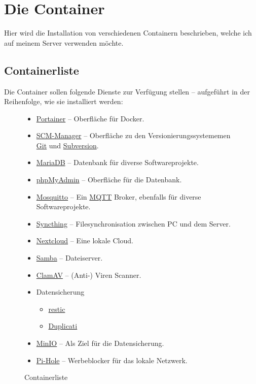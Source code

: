 \documentclass[12pt,a4paper,ngerman]{article}
\newcommand{\jpacaption}[1]{\caption{#1}\label{fig:#1}}
\begin{document}
\section{Die Container}
Hier wird die Installation von verschiedenen Containern beschrieben, welche ich
auf meinem Server verwenden möchte.

\subsection{Containerliste}
Die Container sollen folgende Dienste zur Verfügung stellen -- aufgeführt in der Reihenfolge, wie sie installiert werden:

\begin{figure}[H]
    \begin{itemize}
        \item \href{https://www.portainer.io/}{Portainer} -- Oberfläche für Docker.
        \item \href{https://www.scm-manager.org/}{SCM-Manager} -- Oberfläche zu den Versionierungssystememen \href{https://git-scm.com/}{Git}
              und \href{https://subversion.apache.org/}{Subversion}.
        \item \href{https://mariadb.org/}{MariaDB} -- Datenbank für diverse Softwareprojekte.
        \item \href{https://www.phpmyadmin.net/}{phpMyAdmin} -- Oberfläche für die Datenbank.
        \item \href{https://mosquitto.org/}{Mosquitto} -- Ein \href{https://mqtt.org/}{MQTT} Broker, ebenfalls für diverse
              Softwareprojekte.
        \item \href{https://syncthing.net/}{Syncthing} -- Filesynchronisation zwischen PC und dem Server.
        \item \href{https://nextcloud.com/}{Nextcloud} -- Eine lokale Cloud.
        \item \href{https://www.samba.org/}{Samba} -- Dateiserver.
        \item \href{https://www.clamav.net/}{ClamAV} -- (Anti-) Viren Scanner.
        \item Datensicherung
              \begin{itemize}
                  \item \href{https://restic.net/}{restic}
                  \item \href{https://www.duplicati.com/}{Duplicati}
              \end{itemize}
        \item \href{https://docs.min.io/}{MinIO} -- Als Ziel für die Datensicherung.
        \item \href{https://pi-hole.net/}{Pi-Hole} -- Werbeblocker für das lokale Netzwerk.
    \end{itemize}
    \jpacaption{Containerliste}
\end{figure}
\end{document}
